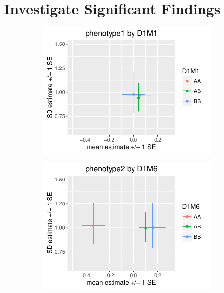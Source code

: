 \documentclass{article}
\begin{document}
\section*{Investigate Significant Findings}

\begin{figure}[ht]
    \begin{subfigure}[t]{0.5\textwidth}
        \includegraphics[width=\textwidth]{images/mean_var_plot_phen1.pdf}
    \end{subfigure}
    \hfill
    \begin{subfigure}[t]{0.5\textwidth}
        \includegraphics[width=\textwidth]{images/mean_var_plot_phen2.pdf}
    \end{subfigure}


\end{figure}
\end{document}
